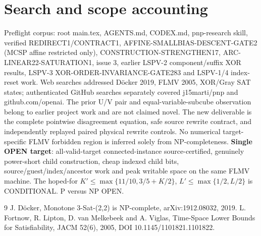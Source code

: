 \documentclass[11pt]{article}
\begin{document}
\section{Search and scope accounting}
Preflight corpus: root main.tex, AGENTS.md, CODEX.md, pnp-research skill, verified REDIRECT1/CONTRACT1, AFFINE-SMALLBIAS-DESCENT-GATE2 (MCSP affine restricted only), CONSTRUCTION-STRENGTHEN17, ARC-LINEAR22-SATURATION1, issue 3, earlier LSPV-2 component/suffix XOR results, LSPV-3 XOR-ORDER-INVARIANCE-GATE283 and LSPV-1/4 index-reset work. Web searches addressed D\"ocker 2019, FLMV 2005, XOR/Gray SAT states; authenticated GitHub searches separately covered j15marti/pnp and github.com/openai. The prior U/V pair and equal-variable-subcube observation belong to earlier project work and are not claimed novel. The new deliverable is the complete pointwise disagreement equation, safe source rewrite contract, and independently replayed paired physical rewrite controls. No numerical target-specific FLMV forbidden region is inferred solely from NP-completeness.
\noindent\textbf{Single OPEN target}: all-valid-target connected-instance source-certified, genuinely power-short child construction, cheap indexed child bits, source/guest/index/ancestor work and peak writable space on the same FLMV machine. The hoped-for $K'\le\max\{11/10,3/5+K/2\}$, $L'\le\max\{1/2,L/2\}$ is CONDITIONAL. P versus NP OPEN.
\begin{thebibliography}{9}
 J. D\"ocker, Monotone 3-Sat-(2,2) is NP-complete, arXiv:1912.08032, 2019.
 L. Fortnow, R. Lipton, D. van Melkebeek and A. Viglas, Time-Space Lower Bounds for Satisfiability, JACM 52(6), 2005, DOI 10.1145/1101821.1101822.
\end{thebibliography}
\end{document}
